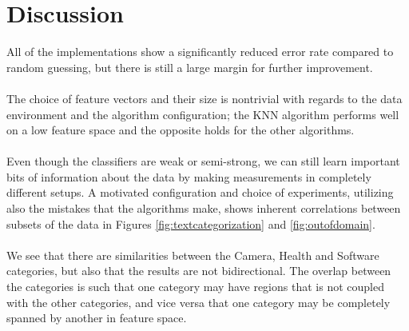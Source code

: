 
\section{Discussion}
All of the implementations show a significantly reduced error rate compared to random guessing, but there is still a large margin for further improvement.
\\\\
The choice of feature vectors and their size is nontrivial with regards to the data environment and the algorithm configuration; the KNN algorithm performs well on a low feature space and the opposite holds for the other algorithms.
\\\\
Even though the classifiers are weak or semi-strong, we can still learn important bits of information about the data by making measurements in completely different setups. A motivated configuration and choice of experiments, utilizing also the mistakes that the algorithms make, shows inherent correlations between subsets of the data in Figures \ref{fig:textcategorization} and \ref{fig:outofdomain}.
\\\\
We see that there are similarities between the Camera, Health and Software categories, but also that the results are not bidirectional. The overlap between the categories is such that one category may have regions that is not coupled with the other categories, and vice versa that one category may be completely spanned by another in feature space.